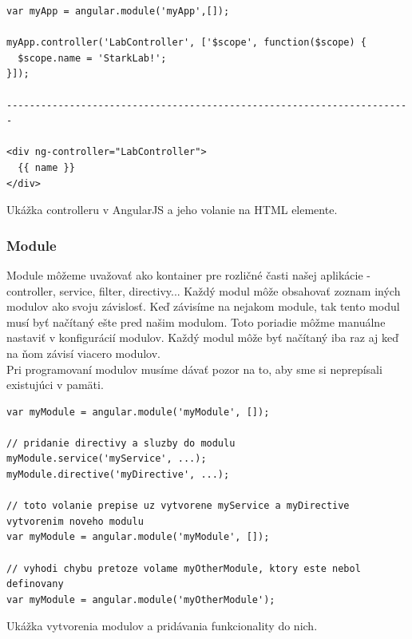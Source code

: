 \begin{algorithm}
\begin{lstlisting}
var myApp = angular.module('myApp',[]);

myApp.controller('LabController', ['$scope', function($scope) {
  $scope.name = 'StarkLab!';
}]);

-----------------------------------------------------------------------

<div ng-controller="LabController">
  {{ name }}
</div>
\end{lstlisting}
 \caption{Ukážka controlleru v AngularJS a jeho volanie na HTML elemente.}
 \label{angular-controller}
\end{algorithm}


\subsubsection{Module}
Module môžeme uvažovať ako kontainer pre rozličné časti našej aplikácie - controller, service, filter, directivy... Každý modul môže obsahovať zoznam iných modulov ako svoju závislosť. Keď závisíme na nejakom module, tak tento modul musí byť načítaný ešte pred našim modulom. Toto poriadie môžme manuálne nastaviť v konfigurácií modulov. Každý modul môže byť načítaný iba raz aj keď na ňom závisí viacero modulov.\\
Pri programovaní modulov musíme dávať pozor na to, aby sme si neprepísali existujúci v pamäti.

\begin{algorithm}
\begin{lstlisting}
var myModule = angular.module('myModule', []);

// pridanie directivy a sluzby do modulu
myModule.service('myService', ...);
myModule.directive('myDirective', ...);

// toto volanie prepise uz vytvorene myService a myDirective vytvorenim noveho modulu
var myModule = angular.module('myModule', []);

// vyhodi chybu pretoze volame myOtherModule, ktory este nebol definovany
var myModule = angular.module('myOtherModule');
\end{lstlisting}
 \caption{Ukážka vytvorenia modulov a pridávania funkcionality do nich.}
 \label{angular-module}
\end{algorithm}

